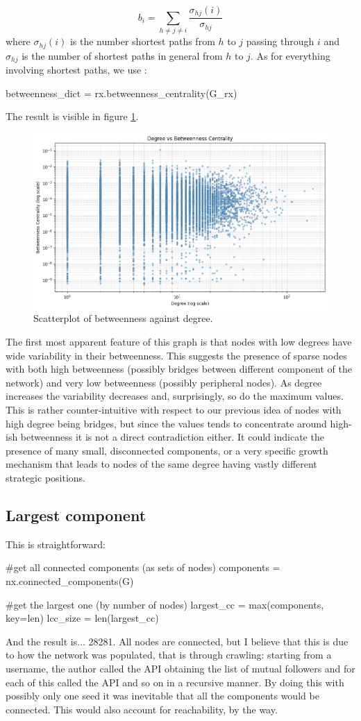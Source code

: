 \documentclass[12pt]{article}
\begin{document}
\begin{equation*}
	b_{i}=\sum_{h\neq j\neq i}\frac{\sigma_{hj}(i)}{\sigma_{hj}}
\end{equation*}
where $\sigma_{hj}(i)$ is the number shortest paths from $h$ to $j$ passing through $i$ and $\sigma_{hj}$ is the number of shortest paths in general from $h$ to $j$. As for everything involving shortest paths, we use :
\begin{py}
	betweenness_dict = rx.betweenness_centrality(G_rx)
\end{py}
The result is visible in figure \ref{fig:screenshot006}.
\begin{figure}[h]
	\centering
	\includegraphics[width=0.6\linewidth]{screenshot006}
	\caption{Scatterplot of betweenness against degree.}
	\label{fig:screenshot006}
\end{figure}
The first most apparent feature of this graph is that nodes with low degrees have wide variability in their betweenness. This suggests the presence of sparse nodes with both high betweenness (possibly bridges between different component of the network) and very low betweenness (possibly peripheral nodes). As degree increases the variability decreases and, surprisingly, so do the maximum values. This is rather counter-intuitive with respect to our previous idea of nodes with high degree being bridges, but since the values tends to concentrate around high-ish betweenness it is not a direct contradiction either. It could indicate the presence of many small, disconnected components, or a very specific growth mechanism that leads to nodes of the same degree having vastly different strategic positions.
\subsection{Largest component}
This is straightforward:
\begin{py}
	#get all connected components (as sets of nodes)
	components = nx.connected_components(G)
	
	#get the largest one (by number of nodes)
	largest_cc = max(components, key=len)
	lcc_size = len(largest_cc)
\end{py}
And the result is... 28281. All nodes are connected, but I believe that this is due to how the network was populated, that is through crawling: starting from a username, the author called the API obtaining the list of mutual followers and for each of this called the API and so on in a recursive manner. By doing this with possibly only one seed it was inevitable that all the components would be connected. This would also account for reachability, by the way.
\end{document}
